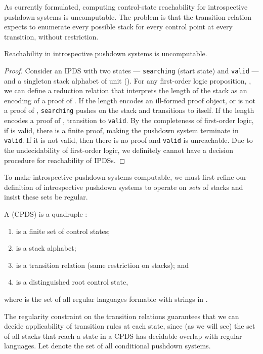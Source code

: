 As currently formulated, computing control-state reachability
for introspective pushdown systems is uncomputable.
The problem is that the transition relation expects to enumerate every possible
stack for every control point at every transition, without restriction.
\begin{theorem}
  Reachability in introspective pushdown systems is uncomputable.
\end{theorem}
\begin{proof}
  Consider an IPDS with two states --- {\tt searching} (start state) and
  {\tt valid} --- and a singleton stack alphabet of unit
  ().
For any first-order logic proposition, , we can define a
  reduction relation that interprets the length of the stack as an
  encoding of a proof of .
If the length encodes an ill-formed proof object, or is not a proof
  of , {\tt searching} pushes  on the stack
  and transitions to itself.
If the length encodes a proof of , transition
  to {\tt valid}.
By the completeness of first-order logic, if  is valid, there
  is a finite proof, making the pushdown system terminate in {\tt valid}.
  If it is not valid, then there is no proof and {\tt valid} is unreachable.
  Due to the undecidability of first-order logic, we definitely cannot have a decision procedure for
  reachability of IPDSs.
\end{proof}


To make introspective pushdown systems computable,
we must first refine our definition of introspective pushdown
systems to operate on \emph{sets} of stacks
and insist these sets be regular.

\newpage

A  (CPDS) is a quadruple
:
\begin{enumerate}

\item  is a finite set of control states;

\item  is a stack alphabet; 

\item  is a transition relation (same restriction on stacks); and

\item  is a distinguished root control state,
\end{enumerate}
where  is the set of all regular languages formable with strings in .

The regularity constraint on the transition relations guarantees that
we can decide applicability of transition rules at each state, since (as we will see)
the set of all stacks that reach a state in a CPDS has decidable overlap with regular languages.
Let  denote the set of all conditional pushdown systems.

